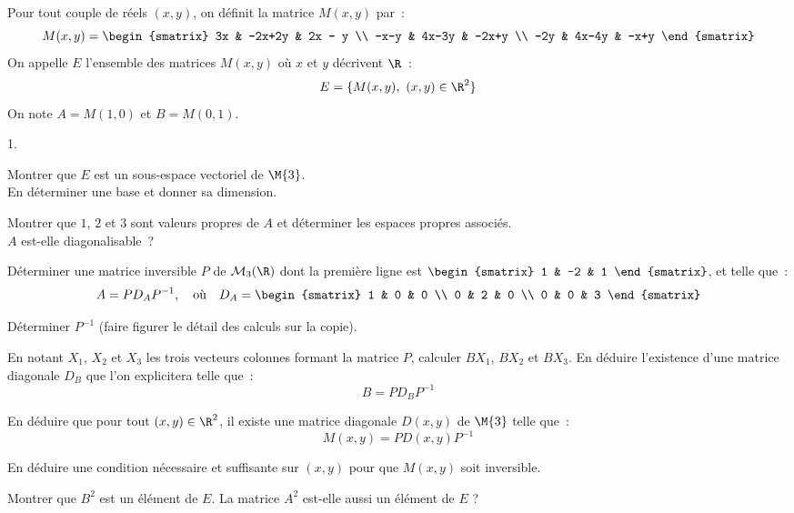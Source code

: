 \documentclass[11pt]{article}%
\begin{document}
\noindent Pour tout couple de réels $(x,y)$, on définit la matrice 
$M(x,y)$ par~:
\[ 
M(x,y) = 
\begin{smatrix} 
3x & -2x+2y & 2x - y \\ 
-x-y & 4x-3y & -2x+y \\
-2y & 4x-4y & -x+y 
\end{smatrix}
\]
On appelle $E$ l'ensemble des matrices $M(x,y)$ où $x$ et $y$ décrivent 
$\R$~:
\[ 
E = \{ M(x,y), \ (x,y) \in \R^2 \} 
\]
On note $A = M(1,0)$ et $B=M(0,1)$.
\begin{noliste}{1.}
 \setlength{\itemsep}{2mm}
 \item Montrer que $E$ est un sous-espace vectoriel de 
 $\M{3}$.\\ 
 En déterminer une base et donner sa 
 dimension.
 
 


 \item Montrer que $1$, $2$ et $3$ sont valeurs propres de $A$ et 
 déterminer les espaces propres associés.\\ 
 $A$ est-elle diagonalisable~?
 
 
 
\item Déterminer une matrice inversible $P$ de $\mathcal{M}_3(\R)$
  dont la première ligne est $\begin{smatrix} 1 & -2 & 1
  \end{smatrix}$, et telle que~:
  \[ 
  A = P D_A P^{-1}, \quad \text{où} \quad D_A = 
  \begin{smatrix} 
    1 & 0 & 0 \\ 
    0 & 2 & 0 \\ 
    0 & 0 & 3 
  \end{smatrix} 
  \]
  
  




 \item Déterminer $P^{-1}$ (faire figurer le détail des calculs sur la 
 copie).
 
 
 
\item En notant $X_1$, $X_2$ et $X_3$ les trois vecteurs colonnes
  formant la matrice $P$, calculer $BX_1$, $BX_2$ et $BX_3$.  En
  déduire l'existence d'une matrice diagonale $D_B$ que l'on
  explicitera telle que~:
  \[ 
  B = PD_BP^{-1} 
  \]
  
  

 
 \item En déduire que pour tout $(x,y) \in \R^2$, il existe une 
 matrice diagonale $D(x,y)$ de $\M{3}$ telle que~:
 \[ 
 M(x,y) = P D(x,y) P^{-1} 
 \]
 
 
 
 

 
 \item En déduire une condition nécessaire et suffisante sur $(x,y)$ 
 pour que $M(x,y)$ soit inversible.

 
 
\item Montrer que $B^2$ est un élément de $E$. La matrice $A^2$
  est-elle aussi un élément de $E$ ?
 
 
 \end{noliste}
\end{document}
